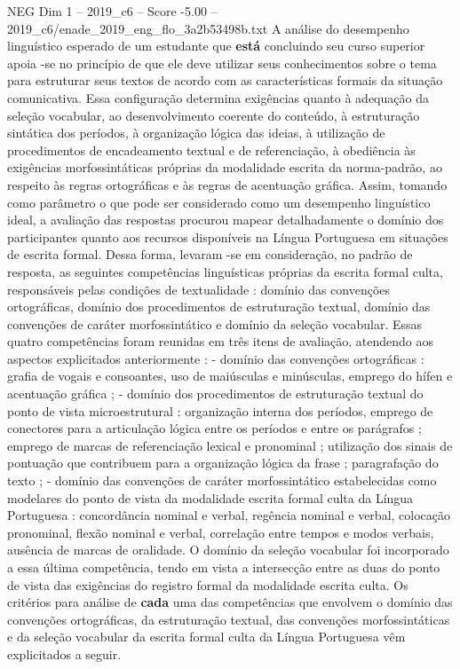 \begin{textsample}{NEG Dim 1 – 2019\_c6 – Score -5.00 – 2019\_c6/enade\_2019\_eng\_flo\_3a2b53498b.txt}
A análise do desempenho linguístico esperado de um estudante que \textbf{está} concluindo seu curso superior apoia -se no princípio de que ele deve utilizar seus conhecimentos sobre o tema para estruturar seus textos de acordo com as características formais da situação comunicativa.
Essa configuração determina exigências quanto à adequação da seleção vocabular, ao desenvolvimento coerente do conteúdo, à estruturação sintática dos períodos, à organização lógica das ideias, à utilização de procedimentos de encadeamento textual e de referenciação, à obediência às exigências morfossintáticas próprias da modalidade escrita da norma-padrão, ao respeito às regras ortográficas e às regras de acentuação gráfica.
Assim, tomando como parâmetro o que pode ser considerado como um desempenho linguístico ideal, a avaliação das respostas procurou mapear detalhadamente o domínio dos participantes quanto aos recursos disponíveis na Língua Portuguesa em situações de escrita formal.
Dessa forma, levaram -se em consideração, no padrão de resposta, as seguintes competências linguísticas próprias da escrita formal culta, responsáveis pelas condições de textualidade : domínio das convenções ortográficas, domínio dos procedimentos de estruturação textual, domínio das convenções de caráter morfossintático e domínio da seleção vocabular.
Essas quatro competências foram reunidas em três itens de avaliação, atendendo aos aspectos explicitados anteriormente : - domínio das convenções ortográficas : grafia de vogais e consoantes, uso de maiúsculas e minúsculas, emprego do hífen e acentuação gráfica ; - domínio dos procedimentos de estruturação textual do ponto de vista microestrutural : organização interna dos períodos, emprego de conectores para a articulação lógica entre os períodos e entre os parágrafos ; emprego de marcas de referenciação lexical e pronominal ; utilização dos sinais de pontuação que contribuem para a organização lógica da frase ; paragrafação do texto ; - domínio das convenções de caráter morfossintático estabelecidas como modelares do ponto de vista da modalidade escrita formal culta da Língua Portuguesa : concordância nominal e verbal, regência nominal e verbal, colocação pronominal, flexão nominal e verbal, correlação entre tempos e modos verbais, ausência de marcas de oralidade.
O domínio da seleção vocabular foi incorporado a essa última competência, tendo em vista a intersecção entre as duas do ponto de vista das exigências do registro formal da modalidade escrita culta.
Os critérios para análise de \textbf{cada} uma das competências que envolvem o domínio das convenções ortográficas, da estruturação textual, das convenções morfossintáticas e da seleção vocabular da escrita formal culta da Língua Portuguesa vêm explicitados a seguir.

\end{textsample}
